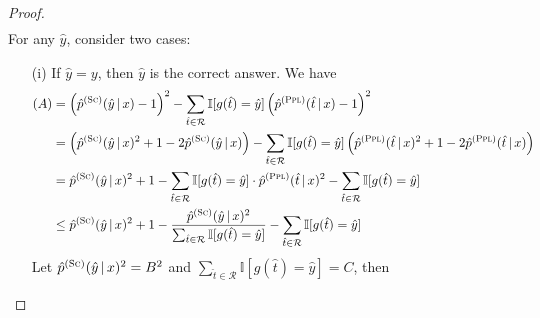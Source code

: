 \begin{proof}
\begin{equation}
\begin{aligned}
        \end{aligned}
    \end{equation}
    For any $\hat{y}$, consider two cases: 
    \begin{enumerate}
        \item[(i)] If $\hat{y} = y$, then $\hat{y}$ is the correct answer. We have 
        \begin{equation}
            \begin{aligned}
                (A) &= \left ( \hat{p}^{(\textsc{Sc})}(\hat{y} \,|\, x) - 1 \right )^2 
                - \sum_{\hat{t} \in \mathcal{R}} \mathbb{I}[g(\hat{t}) = \hat{y}] \left ( \hat{p}^{(\textsc{Ppl})}(\hat{t} \,|\, x) - 1 \right )^2 \\
                &= \left ( \hat{p}^{(\textsc{Sc})}(\hat{y} \,|\, x)^2 + 1 - 2 \hat{p}^{(\textsc{Sc})}(\hat{y} \,|\, x) \right ) 
                - \sum_{\hat{t} \in \mathcal{R}} \mathbb{I}[g(\hat{t}) = \hat{y}] \left ( \hat{p}^{(\textsc{Ppl})}(\hat{t} \,|\, x)^2 + 1 - 2 \hat{p}^{(\textsc{Ppl})}(\hat{t} \,|\, x) \right ) \\
                &= \hat{p}^{(\textsc{Sc})}(\hat{y} \,|\, x)^2 + 1  
                -\sum_{\hat{t} \in \mathcal{R}} \mathbb{I}[g(\hat{t}) = \hat{y}] \cdot \hat{p}^{(\textsc{Ppl})}(\hat{t} \,|\, x)^2
                - \sum_{\hat{t} \in \mathcal{R}} \mathbb{I}[g(\hat{t}) = \hat{y}] \\
                &\leq \hat{p}^{(\textsc{Sc})}(\hat{y} \,|\, x)^2 + 1  - \frac{\hat{p}^{(\textsc{Sc})}(\hat{y} \,|\, x)^2}{\sum_{\hat{t} \in \mathcal{R}} \mathbb{I}[g(\hat{t}) = \hat{y}]} 
                - \sum_{\hat{t} \in \mathcal{R}} \mathbb{I}[g(\hat{t}) = \hat{y}] \\
            \end{aligned}
        \end{equation}
        Let $\hat{p}^{(\textsc{Sc})}(\hat{y} \,|\, x)^2 = B^2$ and $\sum_{\hat{t} \in \mathcal{R}} \mathbb{I}[g(\hat{t}) = \hat{y}]=C$, then

\end{enumerate}
\end{proof}

